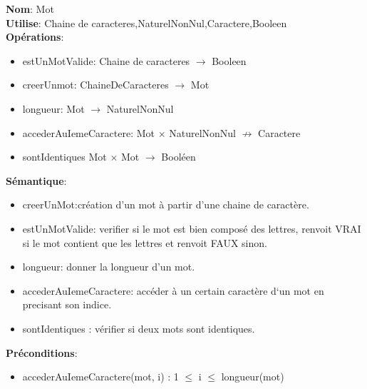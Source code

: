 \documentclass{article}
\begin{document}
    \noindent
    \textbf{Nom}: Mot \\
    \textbf{Utilise}: Chaine de caracteres,NaturelNonNul,Caractere,Booleen \\
    \textbf{Opérations}: \begin{itemize}[label=$\ $, leftmargin=2cm, itemsep=0cm]
        \item estUnMotValide: Chaine de caracteres $\rightarrow $ Booleen
        \item creerUnmot: ChaineDeCaracteres $ \rightarrow$ Mot
        \item longueur: Mot $ \rightarrow$  NaturelNonNul
        \item accederAuIemeCaractere: Mot $ \times $ NaturelNonNul $ \nrightarrow$  Caractere
        \item sontIdentiques Mot $ \times $ Mot $ \rightarrow$  Booléen
    \end{itemize}
    
    \textbf{Sémantique}: \begin{itemize}[label=$\- $, leftmargin=2cm, itemsep=0cm]
      \item creerUnMot:création d’un mot à partir d’une chaine de caractère.
        \item estUnMotValide: verifier si le mot est bien composé des lettres, renvoit VRAI si le mot contient que les lettres et renvoit FAUX sinon.
        \item longueur: donner la longueur d’un mot.
        \item accederAuIemeCaractere: accéder à un certain caractère d`un mot en precisant son indice.
         \item sontIdentiques : vérifier si deux mots sont identiques.
    \end{itemize}

    \textbf{Préconditions}: \begin{itemize}[label=$\- $, leftmargin=2cm, itemsep=0cm]
        \item accederAuIemeCaractere(mot, i) : 1 $\leq$ i $\leq$ longueur(mot)
    \end{itemize}
\end{document}
